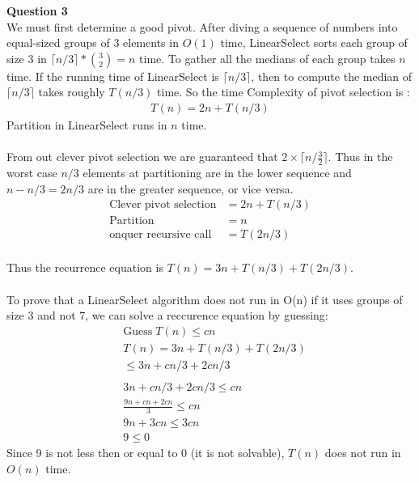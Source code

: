 \documentclass{article}
\begin{document}
\bigskip
{\bf Question 3}\\
We must first determine a good pivot. After diving a sequence of numbers into equal-sized groups of 3 elements in $O(1)$ time, LinearSelect sorts each group of size 3 in $\lceil n/3 \rceil*{3 \choose 2}=n$ time. To gather all the medians of each group takes $n$ time. If the running time of LinearSelect is $\lceil n/3 \rceil$, then to compute the median of $\lceil n/3 \rceil$ takes roughly $T(n/3)$ time. So the time Complexity of pivot selection is :
\begin{equation*}
    \begin{split}
        T(n)=2n+T(n/3)
    \end{split}
\end{equation*}
Partition in LinearSelect runs in $n$ time.\\
\\
From out clever pivot selection we are guaranteed that $2 \times \lceil n/\frac{3}{2} \rceil$. Thus in the worst case $n/3$ elements at partitioning are in the lower sequence and $n-n/3=2n/3$ are in the greater sequence, or vice versa.\\

\begin{equation*}
    \begin{split}
        \text{Clever pivot selection} &= 2n+T(n/3)\\
        \text{Partition} &= n\\
        \text{onquer recursive call} &= T(2n/3)\\
    \end{split}
\end{equation*}

Thus the recurrence equation is $T(n)=3n+T(n/3)+T(2n/3)$.\\
\\
To prove that a LinearSelect algorithm does not run in O(n) if it uses groups of size 3 and not 7, we can solve a reccurence equation by guessing:\\


\begin{equation*}
    \begin{split}
        &\text{Guess}\; T(n) \leq cn\\
        &T(n)=3n+T(n/3)+T(2n/3)\\
        & \leq 3n+cn/3+2cn/3\\
        \\
        &3n+cn/3+2cn/3 \leq cn\\
        &\frac{9n+cn+2cn}{3} \leq cn\\
        &9n+3cn \leq 3cn\\
        & 9 \leq 0
    \end{split}
\end{equation*}
Since 9 is not less then or equal to 0 (it is not solvable), $T(n)$ does not run in $O(n)$ time.
\end{document}
